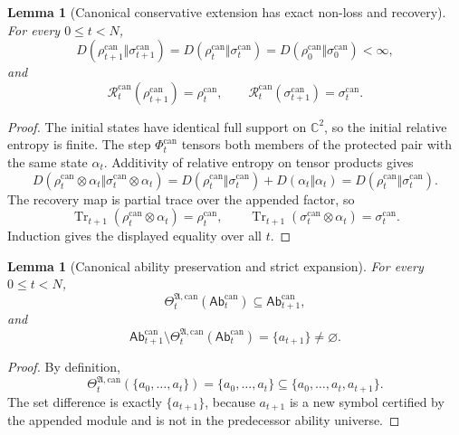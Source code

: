 \documentclass[11pt]{article}
\newtheorem{lemma}[theorem]{Lemma}
\newcommand{\Tr}{\operatorname{Tr}}
\newcommand{\1}{\mathbf{1}}
\begin{document}
\begin{lemma}[Canonical conservative extension has exact non-loss and recovery]
\label{lem:batch13ra_canonical_exact_nonloss_recovery}
For every \(0\le t<N\),
\[
D(\rho_{t+1}^{\mathrm{can}}\Vert\sigma_{t+1}^{\mathrm{can}})
=
D(\rho_t^{\mathrm{can}}\Vert\sigma_t^{\mathrm{can}})
=
D(\rho_0^{\mathrm{can}}\Vert\sigma_0^{\mathrm{can}})<\infty,
\]
and
\[
\mathcal R_t^{\mathrm{can}}(\rho_{t+1}^{\mathrm{can}})=\rho_t^{\mathrm{can}},
\qquad
\mathcal R_t^{\mathrm{can}}(\sigma_{t+1}^{\mathrm{can}})=\sigma_t^{\mathrm{can}}.
\]
\end{lemma}

\begin{proof}
The initial states have identical full support on \(\mathbb C^2\), so the initial relative entropy is finite.  The step \(\Phi_t^{\mathrm{can}}\) tensors both members of the protected pair with the same state \(\alpha_t\).  Additivity of relative entropy on tensor products gives
\[
D(\rho_t^{\mathrm{can}}\otimes\alpha_t\Vert\sigma_t^{\mathrm{can}}\otimes\alpha_t)
= D(\rho_t^{\mathrm{can}}\Vert\sigma_t^{\mathrm{can}})+D(\alpha_t\Vert\alpha_t)
= D(\rho_t^{\mathrm{can}}\Vert\sigma_t^{\mathrm{can}}).
\]
The recovery map is partial trace over the appended factor, so
\[
\Tr_{t+1}(\rho_t^{\mathrm{can}}\otimes\alpha_t)=\rho_t^{\mathrm{can}},
\qquad
\Tr_{t+1}(\sigma_t^{\mathrm{can}}\otimes\alpha_t)=\sigma_t^{\mathrm{can}}.
\]
Induction gives the displayed equality over all \(t\).
\end{proof}

\begin{lemma}[Canonical ability preservation and strict expansion]
\label{lem:batch13ra_canonical_ability_expansion}
For every \(0\le t<N\),
\[
\Theta_t^{\mathfrak A,\mathrm{can}}
(\mathsf{Ab}_t^{\mathrm{can}})
\subseteq
\mathsf{Ab}_{t+1}^{\mathrm{can}},
\]
and
\[
\mathsf{Ab}_{t+1}^{\mathrm{can}}
\setminus
\Theta_t^{\mathfrak A,\mathrm{can}}
(\mathsf{Ab}_t^{\mathrm{can}})
=\{a_{t+1}\}\ne\varnothing.
\]
\end{lemma}

\begin{proof}
By definition,
\[
\Theta_t^{\mathfrak A,\mathrm{can}}
(\{a_0,\ldots,a_t\})=\{a_0,\ldots,a_t\}
\subseteq
\{a_0,\ldots,a_t,a_{t+1}\}.
\]
The set difference is exactly \(\{a_{t+1}\}\), because \(a_{t+1}\) is a new symbol certified by the appended module and is not in the predecessor ability universe.
\end{proof}
\end{document}
